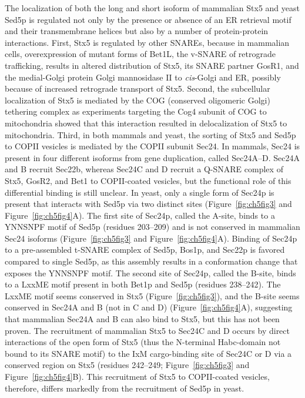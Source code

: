 The localization of both the long and short isoform of mammalian Stx5 and yeast Sed5p is regulated not only by the presence or absence of an ER retrieval motif and their transmembrane helices but also by a number of protein-protein interactions. First, Stx5 is regulated by other SNAREs, because in mammalian cells, overexpression of mutant forms of Bet1L, the v-SNARE of retrograde trafficking, results in altered distribution of Stx5, its SNARE partner GosR1, and the medial-Golgi protein Golgi mannosidase II to \emph{cis}-Golgi and ER\cite{xu_gs15_2002}, possibly because of increased retrograde transport of Stx5. Second, the subcellular localization of Stx5 is mediated by the COG (conserved oligomeric Golgi) tethering complex as experiments targeting the Cog4 subunit of COG to mitochondria showed that this interaction resulted in delocalization of Stx5 to mitochondria\cite{willett_cog_2013}. Third, in both mammals and yeast, the sorting of Stx5 and Sed5p to COPII vesicles is mediated by the COPII subunit Sec24. In mammals, Sec24 is present in four different isoforms from gene duplication, called Sec24A–D. Sec24A and B recruit Sec22b, whereas Sec24C and D recruit a Q-SNARE complex of Stx5, GosR2, and Bet1 to COPII-coated vesicles\cite{adolf_sec24c/d-isoformspecific_2016,mancias_structural_2008}, but the functional role of this differential binding is still unclear. In yeast, only a single form of Sec24p is present that interacts with Sed5p via two distinct sites (Figure~\ref{fig:ch5fig3} and Figure~\ref{fig:ch5fig4}A)\cite{peng_specific_1999,mossessova_snare_2003}. The first site of Sec24p, called the A-site, binds to a YNNSNPF motif of Sed5p (residues 203–209)\cite{peng_specific_1999} and is not conserved in mammalian Sec24 isoforms (Figure~\ref{fig:ch5fig3} and Figure~\ref{fig:ch5fig4}A). Binding of Sec24p to a pre-assembled t-SNARE complex of Sed5p, Bos1p, and Sec22p is favored compared to single Sed5p, as this assembly results in a conformation change that exposes the YNNSNPF motif\cite{peng_specific_1999}. The second site of Sec24p, called the B-site, binds to a LxxME motif present in both Bet1p and Sed5p (residues 238–242)\cite{peng_specific_1999}. The LxxME motif seems conserved in Stx5 (Figure~\ref{fig:ch5fig3}), and the B-site seems conserved in Sec24A and B (not in C and D) (Figure~\ref{fig:ch5fig4}A), suggesting that mammalian Sec24A and B can also bind to Stx5, but this has not been proven. The recruitment of mammalian Stx5 to Sec24C and D occurs by direct interactions of the open form of Stx5 (thus the N-terminal Habc-domain not bound to its SNARE motif) to the IxM cargo-binding site of Sec24C or D via a conserved region on Stx5 (residues 242–249; Figure~\ref{fig:ch5fig3} and Figure~\ref{fig:ch5fig4}B)\cite{adolf_sec24c/d-isoformspecific_2016,mancias_structural_2008}. This recruitment of Stx5 to COPII-coated vesicles, therefore, differs markedly from the recruitment of Sed5p in yeast.

